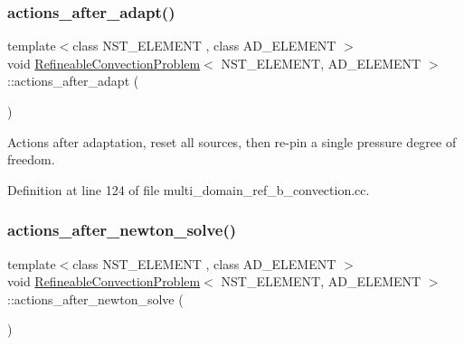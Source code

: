\subsubsection{\texorpdfstring{actions\+\_\+after\+\_\+adapt()}{actions\_after\_adapt()}\hspace{0.1cm}{\footnotesize\ttfamily [2/2]}}
{\footnotesize\ttfamily template$<$class N\+S\+T\+\_\+\+E\+L\+E\+M\+E\+NT , class A\+D\+\_\+\+E\+L\+E\+M\+E\+NT $>$ \\
void \hyperlink{classRefineableConvectionProblem}{Refineable\+Convection\+Problem}$<$ N\+S\+T\+\_\+\+E\+L\+E\+M\+E\+NT, A\+D\+\_\+\+E\+L\+E\+M\+E\+NT $>$\+::actions\+\_\+after\+\_\+adapt (\begin{DoxyParamCaption}{ }\end{DoxyParamCaption})\hspace{0.3cm}{\ttfamily [inline]}}



Actions after adaptation, reset all sources, then re-\/pin a single pressure degree of freedom. 



Definition at line 124 of file multi\+\_\+domain\+\_\+ref\+\_\+b\+\_\+convection.\+cc.

\mbox{\label{classRefineableConvectionProblem_a13bda5e5e75928efa88433902ccab7ee}} 
\subsubsection{\texorpdfstring{actions\+\_\+after\+\_\+newton\+\_\+solve()}{actions\_after\_newton\_solve()}\hspace{0.1cm}{\footnotesize\ttfamily [1/2]}}
{\footnotesize\ttfamily template$<$class N\+S\+T\+\_\+\+E\+L\+E\+M\+E\+NT , class A\+D\+\_\+\+E\+L\+E\+M\+E\+NT $>$ \\
void \hyperlink{classRefineableConvectionProblem}{Refineable\+Convection\+Problem}$<$ N\+S\+T\+\_\+\+E\+L\+E\+M\+E\+NT, A\+D\+\_\+\+E\+L\+E\+M\+E\+NT $>$\+::actions\+\_\+after\+\_\+newton\+\_\+solve (\begin{DoxyParamCaption}{ }\end{DoxyParamCaption})\hspace{0.3cm}{\ttfamily [inline]}}



